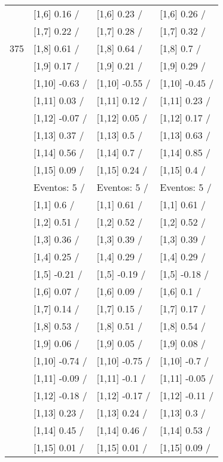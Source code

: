 \begin{table}
\begin{tabular}[t]{llll}
 & {}[1,6] 0.16  / & {}[1,6] 0.23  / & {}[1,6] 0.26  /\\
 & {}[1,7] 0.22  / & {}[1,7] 0.28  / & {}[1,7] 0.32  /\\
375 & {}[1,8] 0.61  / & {}[1,8] 0.64  / & {}[1,8] 0.7  /\\
\addlinespace
 & {}[1,9] 0.17  / & {}[1,9] 0.21  / & {}[1,9] 0.29  /\\
 & {}[1,10] -0.63  / & {}[1,10] -0.55  / & {}[1,10] -0.45  /\\
 & {}[1,11] 0.03  / & {}[1,11] 0.12  / & {}[1,11] 0.23  /\\
 & {}[1,12] -0.07  / & {}[1,12] 0.05  / & {}[1,12] 0.17  /\\
 & {}[1,13] 0.37  / & {}[1,13] 0.5  / & {}[1,13] 0.63  /\\
\addlinespace
 & {}[1,14] 0.56  / & {}[1,14] 0.7  / & {}[1,14] 0.85  /\\
 & {}[1,15] 0.09  / & {}[1,15] 0.24  / & {}[1,15] 0.4  /\\
 & Eventos:  5 / & Eventos:  5 / & Eventos:  5 /\\
 & {}[1,1] 0.6  / & {}[1,1] 0.61  / & {}[1,1] 0.61  /\\
 & {}[1,2] 0.51  / & {}[1,2] 0.52  / & {}[1,2] 0.52  /\\
\addlinespace
 & {}[1,3] 0.36  / & {}[1,3] 0.39  / & {}[1,3] 0.39  /\\
 & {}[1,4] 0.25  / & {}[1,4] 0.29  / & {}[1,4] 0.29  /\\
 & {}[1,5] -0.21  / & {}[1,5] -0.19  / & {}[1,5] -0.18  /\\
 & {}[1,6] 0.07  / & {}[1,6] 0.09  / & {}[1,6] 0.1  /\\
 & {}[1,7] 0.14  / & {}[1,7] 0.15  / & {}[1,7] 0.17  /\\
\addlinespace
500 & {}[1,8] 0.53  / & {}[1,8] 0.51  / & {}[1,8] 0.54  /\\
 & {}[1,9] 0.06  / & {}[1,9] 0.05  / & {}[1,9] 0.08  /\\
 & {}[1,10] -0.74  / & {}[1,10] -0.75  / & {}[1,10] -0.7  /\\
 & {}[1,11] -0.09  / & {}[1,11] -0.1  / & {}[1,11] -0.05  /\\
 & {}[1,12] -0.18  / & {}[1,12] -0.17  / & {}[1,12] -0.11  /\\
\addlinespace
 & {}[1,13] 0.23  / & {}[1,13] 0.24  / & {}[1,13] 0.3  /\\
 & {}[1,14] 0.45  / & {}[1,14] 0.46  / & {}[1,14] 0.53  /\\
 & {}[1,15] 0.01  / & {}[1,15] 0.01  / & {}[1,15] 0.09  /\\
\bottomrule
\end{tabular}
\end{table}
